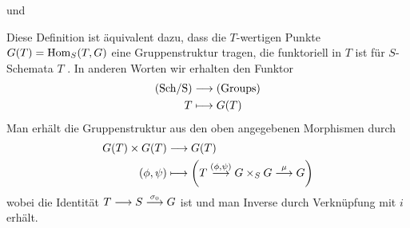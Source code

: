 \documentclass[german]{scrreprt}
\begin{document}
\begin{Definition}[$S$-Gruppenschema]
\begin{description}[labelwidth=4cm]
    und
  \item[Assoziativität]
\end{description}
\begin{Bemerkung}
  Diese Definition ist äquivalent dazu, dass die $T$-wertigen Punkte
  $G(T)=\operatorname{Hom}_S(T,G)$ eine Gruppenstruktur tragen, die funktoriell in
  $T$ ist für $S$-Schemata $T$ \cite[Chapter (4.15)]{wedhorn}. 
  In anderen Worten wir erhalten den Funktor 
  \begin{align*}
    \text{(Sch/S)} &\longrightarrow \text{(Groups)}\\
    T &\longmapsto G(T)
  \end{align*}
  Man erhält die Gruppenstruktur aus den oben angegebenen Morphismen
  durch
  \begin{align*}
    G(T)\times G(T) &\longrightarrow G(T)\\
    (\phi, \psi) &\longmapsto 
                   \left(
                   T\overset{(\phi,\psi)}{\longrightarrow} G\times_S G
                   \overset\mu{\longrightarrow} G
                   \right)
  \end{align*}
  wobei die Identität $T\longrightarrow S\overset{\sigma_0}{\longrightarrow} G$ ist und
  man Inverse durch Verknüpfung mit $i$ erhält.
  \cite[Proposition IV.3.2]{silverman2}
\end{Bemerkung}


\end{Definition}
\end{document}
